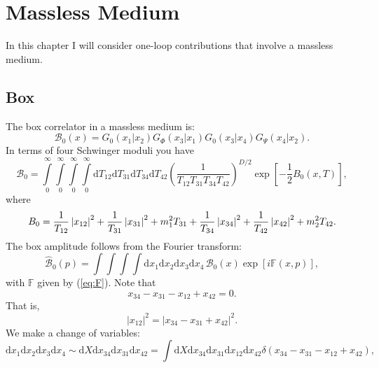 \chapter{Massless Medium}
In this chapter I will consider one-loop contributions that involve a massless medium.
\section{Box}
The box correlator in a massless medium is:
\begin{equation}
	\mathcal{B}_{0}(x) = G_{0}(x_{1}| x_{2}) G_{\Phi}(x_{3}| x_{1}) G_{0}(x_{3}| x_{4}) G_{\Psi}(x_{4}| x_{2}).
	\label{eq:box_A}
\end{equation}
In terms of four Schwinger moduli you have
\begin{equation}
	\mathcal{B}_{0} = \int\limits_{0}^{\infty} \int\limits_{0}^{\infty} \int\limits_{0}^{\infty} \int\limits_{0}^{\infty} \mathrm{d}T_{12} \mathrm{d}T_{31} \mathrm{d}T_{34} \mathrm{d}T_{42} \left( \frac{1}{T_{12} T_{31} T_{34} T_{42}} \right)^{D/2} \exp{\left[- \frac{1}{2} B_{0}(x, T) \right]},
\end{equation}
where
\begin{equation}
	B_{0} = \frac{1}{T_{12}} \left\lvert x_{12} \right\rvert^{2} + \frac{1}{T_{31}} \left\lvert x_{31} \right\rvert^{2} + m_{1}^{2} T_{31} + \frac{1}{T_{34}} \left\lvert x_{34} \right\rvert^{2} + \frac{1}{T_{42}} \left\lvert x_{42} \right\rvert^{2} + m_{2}^{2} T_{42}.
\end{equation}
The box amplitude follows from the Fourier transform:
\begin{equation}
	\widehat{\mathcal{B}}_{0}(p) = \int \int \int \int \mathrm{d}x_{1} \mathrm{d}x_{2} \mathrm{d}x_{3} \mathrm{d}x_{4} \, \mathcal{B}_{0}(x) \exp{\left[ i \mathbb{F}(x, p) \right]},
\end{equation}
with $\mathbb{F}$ given by (\ref{eq:F}). Note that
\begin{equation}
	x_{34} - x_{31} - x_{12} + x_{42} = 0.
\end{equation}
That is,
\begin{equation}
	|x_{12}|^{2} = |x_{34} - x_{31} + x_{42}|^{2}.
\end{equation}
We make a change of variables:
\begin{equation}
	\mathrm{d}x_{1} \mathrm{d}x_{2} \mathrm{d}x_{3} \mathrm{d}x_{4} \sim \mathrm{d}X \mathrm{d}x_{34} \mathrm{d}x_{31} \mathrm{d}x_{42} = \int \mathrm{d}X \mathrm{d}x_{34} \mathrm{d}x_{31} \mathrm{d}x_{12} \mathrm{d}x_{42} \delta(x_{34} - x_{31} - x_{12} + x_{42}),
\end{equation}
